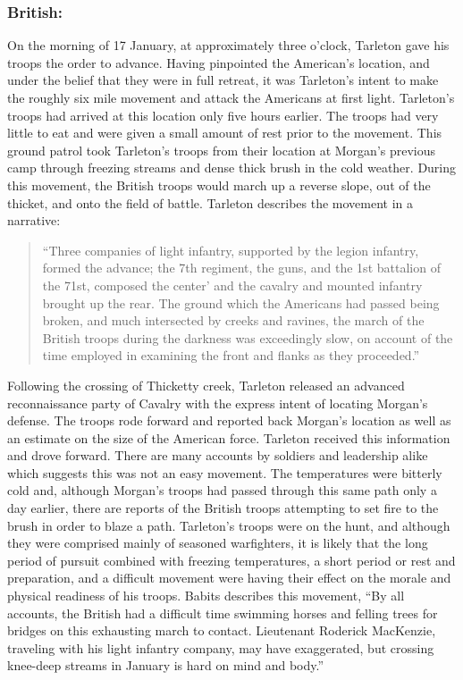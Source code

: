 \subsubsection{British:}

On the morning of 17 January, at approximately three o'clock, Tarleton gave his
troops the order to advance. Having pinpointed the American's location, and
under the belief that they were in full retreat, it was Tarleton's intent to
make the roughly six mile movement and attack the Americans at first light.
Tarleton's troops had arrived at this location only five hours earlier. The
troops had very little to eat and were given a small amount of rest prior to
the movement. This ground patrol took Tarleton's troops from their location at
Morgan's previous camp through freezing streams and dense thick brush in the
cold weather. During this movement, the British troops would march up a reverse
slope, out of the thicket, and onto the field of battle. Tarleton describes the
movement in a narrative:

\begin{quotation}
 ``Three companies of light infantry, supported by the legion infantry, formed
 the advance; the 7th regiment, the guns, and the 1st battalion of the 71st,
 composed the center' and the cavalry and mounted infantry brought up the rear.
 The ground which the Americans had passed being broken, and much intersected
 by creeks and ravines, the march of the British troops during the darkness was
 exceedingly slow, on account of the time employed in examining the front and
 flanks as they proceeded.'' \cite[TAB Q, 14]{rauch_battle_2007}
\end{quotation}

Following the crossing of Thicketty creek, Tarleton released an advanced
reconnaissance party of Cavalry with the express intent of locating Morgan's
defense. The troops rode forward and reported back Morgan's location as well as
an estimate on the size of the American force. Tarleton received this
information and drove forward. There are many accounts by soldiers and
leadership alike which suggests this was not an easy movement. The temperatures
were bitterly cold and, although Morgan's troops had passed through this same
path only a day earlier, there are reports of the British troops attempting to
set fire to the brush in order to blaze a path. Tarleton's troops were on the
hunt, and although they were comprised mainly of seasoned warfighters, it is
likely that the long period of pursuit combined with freezing temperatures, a
short period or rest and preparation, and a difficult movement were having
their effect on the morale and physical readiness of his troops. Babits
describes this movement, ``By all accounts, the British had a difficult time
swimming horses and felling trees for bridges on this exhausting march to
contact. Lieutenant Roderick MacKenzie, traveling with his light infantry
company, may have exaggerated, but crossing knee-deep streams in January is
hard on mind and body.'' \cite[57]{babits_devil_2001}


